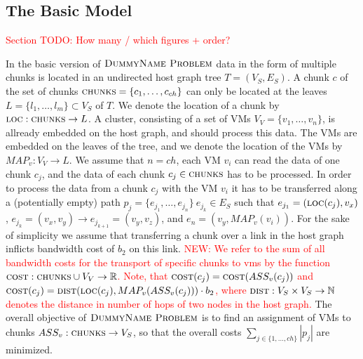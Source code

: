 \documentclass[9pt,twocolumn]{scrartcl}
\newcommand{\Chunk}{\ensuremath{c}}
\newcommand{\Problem}{\textsc{DummyName Problem}}
\newcommand{\carlo}[1]{\textcolor{red}{#1}}
\newcommand{\Path}{\ensuremath{p}}
\newcommand{\VmChunkAssignment}{\ensuremath{ASS_v}}
\newcommand{\NodeMapping}{\ensuremath{MAP_v}}
\newcommand{\ChunkLocation}{\ensuremath{\textsc{loc}}}
\newcommand{\VirtualNodes}{\ensuremath{V_V}}
\newcommand{\VirtualNode}{\ensuremath{v}}
\newcommand{\SubstrateNodes}{\ensuremath{V_S}}
\newcommand{\SubstrateEdges}{\ensuremath{E_S}}
\newcommand{\SubstrateNode}{\ensuremath{v}}
\newcommand{\SubstrateEdge}{\ensuremath{e}}
\newcommand{\Leaf}{\ensuremath{l}}
\newcommand{\Leaves}{\ensuremath{L}}
\newcommand{\Chunks}{\ensuremath{\textsc{chunks}}}
\newcommand{\Tree}{\ensuremath{T}}
\newcommand{\CostTrans}{\ensuremath{b_2}}
\newcommand{\Vms}{\ensuremath{n}}
\newcommand{\ChunkTypes}{\ensuremath{ch}}
\begin{document}
\subsection{The Basic Model}

\carlo{Section TODO: How many / which figures + order?}

In the basic version of $\Problem$ data in the form of multiple chunks is
located in an undirected host graph tree $\Tree = (\SubstrateNodes,
\SubstrateEdges)$. A chunk $\Chunk$ of the set of chunks $\Chunks =
\{\Chunk_1,\dots,\Chunk_{\ChunkTypes}\}$ can only be located at the leaves
$\Leaves = \{\Leaf_1,\dots,\Leaf_m\} \subset \SubstrateNodes$ of $\Tree$. We
denote the location of a chunk by $\ChunkLocation : \Chunks \rightarrow
\Leaves$. A cluster, consisting of a set of VMs $\VirtualNodes =
\{\VirtualNode_1,\dots,\VirtualNode_{\Vms}\}$, is allready embedded on the host
graph, and should process this data. The VMs are embedded on the
leaves of the tree, and we denote the location of the VMs by $\NodeMapping :
\VirtualNodes \rightarrow \Leaves$. We assume that $\Vms = \ChunkTypes$, each
VM $\VirtualNode_i$ can read the data of one chunk $\Chunk_j$, and the data of
each chunk $\Chunk_j \in \Chunks$ has to be processed. In order to process the
data from a chunk $\Chunk_j$ with the VM $\VirtualNode_i$ it has to be
transferred along a (potentially empty) path $\Path_j =
\{\SubstrateEdge_{j_1},\dots,\SubstrateEdge_{j_n}\} ~ \SubstrateEdge_{j_k} \in
\SubstrateEdges$ such that $\SubstrateEdge_{j_1} = (\ChunkLocation(\Chunk_j),
\SubstrateNode_x)$, $\SubstrateEdge_{j_k} = (\SubstrateNode_x,
\SubstrateNode_y) \rightarrow \SubstrateEdge_{j_{k+1}} = (\SubstrateNode_y ,
\SubstrateNode_z)$, and $\SubstrateEdge_n = (\SubstrateNode_y,
\NodeMapping(\VirtualNode_i))$.  For the sake of simplicity we assume that
transferring a chunk over a link in the host graph inflicts bandwidth cost of
$\CostTrans$ on this link. \carlo{NEW: We refer to the sum of all bandwidth
costs for the transport of specific chunks to vms by the function
$\CostPerChunk : \Chunks \cup \VirtualNodes \rightarrow \mathbb{R}$. Note, that
$\CostPerChunk(\Chunk_j) = \CostPerChunk(\VmChunkAssignment(\Chunk_j))$ and
$\CostPerChunk(\Chunk_j) = \Distance(\ChunkLocation(\Chunk_j),
\NodeMapping(\VmChunkAssignment(\Chunk_j))) \cdot \CostTrans$, where $\Distance
: \SubstrateNodes \times \SubstrateNodes \rightarrow \mathbb{N}$ denotes the
distance in number of hops of two nodes in the host graph.} The overall
objective of $\Problem$ is to find an
assignment of VMs to chunks $\VmChunkAssignment : \Chunks \rightarrow
\SubstrateNodes$, so that the overall costs $\sum_{j \in
\{1,\dots,\ChunkTypes\}} |\Path_j|$ are minimized.
\end{document}
